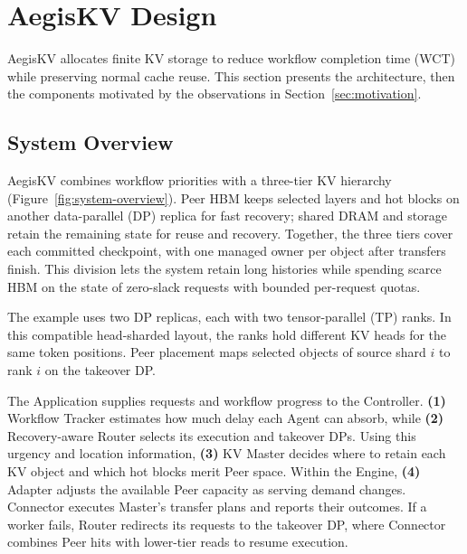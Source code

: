\section{AegisKV Design}
\label{sec:design}

AegisKV allocates finite KV storage to reduce workflow completion time
(WCT) while preserving normal cache reuse. This section presents the
architecture, then the components motivated by the observations in
Section~\ref{sec:motivation}.

\subsection{System Overview}
\label{sec:system-overview}

AegisKV combines workflow priorities with a three-tier KV hierarchy
(Figure~\ref{fig:system-overview}). Peer HBM keeps selected
layers and hot blocks on another data-parallel (DP) replica for fast
recovery; shared DRAM and storage retain the remaining state for reuse
and recovery. Together, the three tiers cover each committed checkpoint,
with one managed owner per object after transfers finish. This division lets
the system retain long histories while spending scarce HBM on the state
of zero-slack requests with bounded per-request quotas.

The example uses two DP replicas, each with two tensor-parallel (TP)
ranks. In this compatible head-sharded layout, the ranks hold different
KV heads for the same token positions. Peer placement maps selected
objects of source shard $i$ to rank $i$ on the takeover DP.

The Application supplies requests and workflow progress to the Controller.
\textbf{(1)} Workflow Tracker estimates how much delay each Agent can
absorb, while \textbf{(2)} Recovery-aware Router selects its execution and
takeover DPs. Using this urgency and location information, \textbf{(3)} KV
Master decides where to retain each KV object and which hot blocks merit
Peer space. Within the Engine, \textbf{(4)} Adapter adjusts the available
Peer capacity as serving demand changes. Connector executes Master's
transfer plans and reports their outcomes. If a worker fails, Router redirects its requests to the
takeover DP, where Connector combines Peer hits with lower-tier reads to
resume execution.

